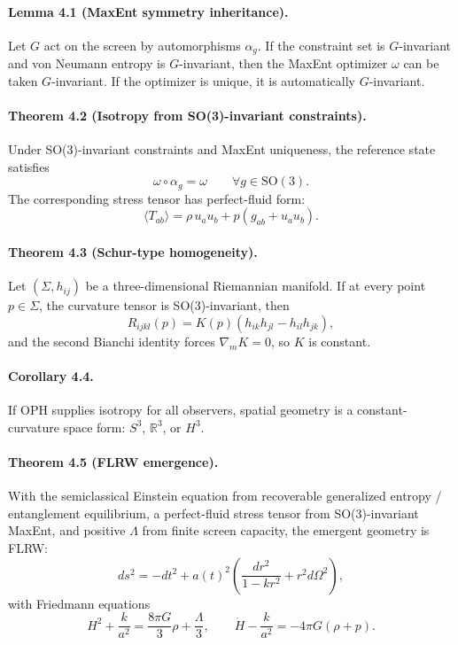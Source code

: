 \paragraph{\textbf{Lemma 4.1 (MaxEnt symmetry inheritance).}}
Let \(G\) act on the screen by automorphisms \(\alpha_g\). If the constraint set is
\(G\)-invariant and von Neumann entropy is \(G\)-invariant, then the MaxEnt optimizer \(\omega\)
can be taken \(G\)-invariant. If the optimizer is unique, it is automatically \(G\)-invariant.

\paragraph{\textbf{Theorem 4.2 (Isotropy from SO(3)-invariant constraints).}}
Under SO(3)-invariant constraints and MaxEnt uniqueness, the reference state satisfies
\[
\omega\circ\alpha_g=\omega
\qquad
\forall g\in \mathrm{SO}(3).
\]
The corresponding stress tensor has perfect-fluid form:
\[
\langle T_{ab}\rangle=\rho\,u_au_b+p(g_{ab}+u_au_b).
\]

\paragraph{\textbf{Theorem 4.3 (Schur-type homogeneity).}}
Let \((\Sigma,h_{ij})\) be a three-dimensional Riemannian manifold. If at every point
\(p\in\Sigma\), the curvature tensor is SO(3)-invariant, then
\[
R_{ijkl}(p)=K(p)(h_{ik}h_{jl}-h_{il}h_{jk}),
\]
and the second Bianchi identity forces \(\nabla_m K=0\), so \(K\) is constant.

\paragraph{\textbf{Corollary 4.4.}}
If OPH supplies isotropy for all observers, spatial geometry is a constant-curvature space form:
\(S^3\), \(\mathbb R^3\), or \(H^3\).

\paragraph{\textbf{Theorem 4.5 (FLRW emergence).}}
With the semiclassical Einstein equation from recoverable generalized entropy / entanglement
equilibrium, a perfect-fluid stress tensor from SO(3)-invariant MaxEnt, and positive \(\Lambda\)
from finite screen capacity, the emergent geometry is FLRW:
\[
ds^2=-dt^2+a(t)^2\left(\frac{dr^2}{1-kr^2}+r^2d\Omega^2\right),
\]
with Friedmann equations
\[
H^2+\frac{k}{a^2}=\frac{8\pi G}{3}\rho+\frac{\Lambda}{3},
\qquad
\dot H-\frac{k}{a^2}=-4\pi G(\rho+p).
\]

